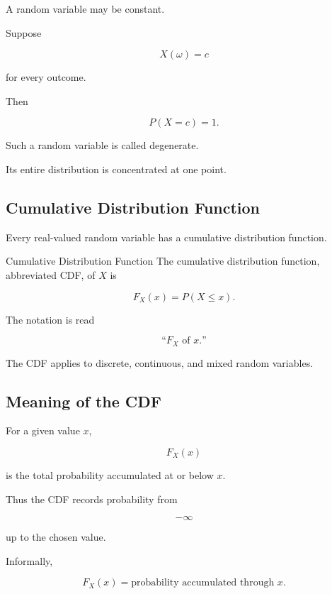 A random variable may be constant.

Suppose

\[
X(\omega)=c
\]

for every outcome.

Then

\[
\boxed{
P(X=c)=1.
}
\]

Such a random variable is called degenerate.

Its entire distribution is concentrated at one point.

\subsection{Cumulative Distribution Function}
\label{subsec:cumulative-distribution-function}

Every real-valued random variable has a cumulative distribution
function.

\begin{definitionbox}{Cumulative Distribution Function}
The cumulative distribution function, abbreviated CDF, of \(X\) is

\[
\boxed{
F_X(x)
=
P(X\leq x).
}
\]
\end{definitionbox}

The notation is read

\[
\text{``\(F_X\) of \(x\).''}
\]

The CDF applies to discrete, continuous, and mixed random variables.

\subsection{Meaning of the CDF}
\label{subsec:cdf-meaning}

For a given value \(x\),

\[
F_X(x)
\]

is the total probability accumulated at or below \(x\).

Thus the CDF records probability from

\[
-\infty
\]

up to the chosen value.

Informally,

\[
\boxed{
F_X(x)
=
\text{probability accumulated through }x.
}
\]

